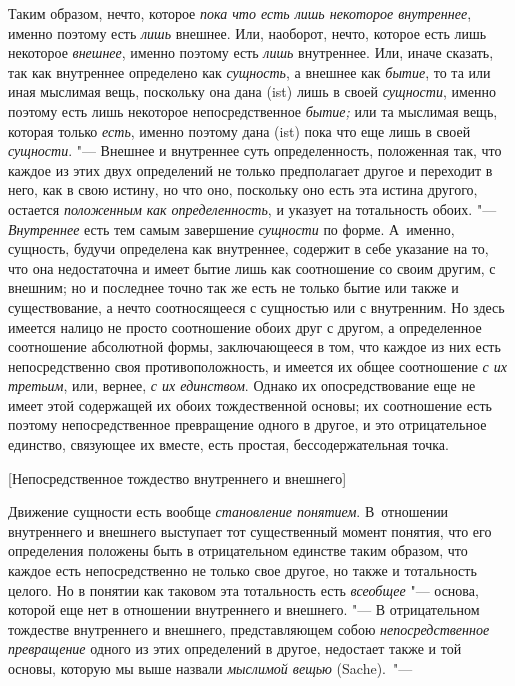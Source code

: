 Таким образом, нечто, которое {\em пока что есть лишь
некоторое внутреннее}, именно поэтому есть {\em лишь}
внешнее. Или, наоборот, нечто, которое есть лишь некоторое
{\em внешнее}, именно поэтому есть
{\em лишь} внутреннее. Или, иначе сказать, так как
внутреннее определено как {\em сущность}, а внешнее как
{\em бытие}, то та или иная мыслимая вещь, поскольку
она дана (ist) лишь в своей {\em сущности}, именно
поэтому есть лишь некоторое непосредственное
{\em бытие;} или та мыслимая вещь, которая только
{\em есть}, именно поэтому дана (ist) пока что еще лишь
в своей {\em сущности}. "--- Внешнее и внутреннее суть
определенность, положенная так, что каждое из этих двух определений не
только предполагает другое и переходит в него, как в свою истину, но что
оно, поскольку оно есть эта истина другого, остается
{\em положенным как определенность}, и указует на
тотальность обоих. "--- {\em Внутреннее} есть тем самым
завершение {\em сущности} по форме. А~именно, сущность,
будучи определена как внутреннее, содержит в себе указание на то, что она
недостаточна и имеет бытие лишь как соотношение со своим другим, с внешним;
но и последнее точно так же есть не только бытие или также и существование,
а нечто соотносящееся с сущностью или с внутренним. Но здесь имеется налицо
не просто соотношение обоих друг с другом, а определенное соотношение
абсолютной формы, заключающееся в том, что каждое из них есть
непосредственно своя противоположность, и имеется их общее соотношение
{\em с их третьим}, или, вернее,
{\em с их единством}. Однако их опосредствование еще не
имеет этой содержащей их обоих тождественной основы; их соотношение есть
поэтому непосредственное превращение одного в другое, и это отрицательное
единство, связующее их вместе, есть простая, бессодержательная точка.

%
  {[Непосредственное тождество внутреннего и внешнего]}

Движение сущности есть вообще {\em становление
понятием}. В~отношении внутреннего и внешнего выступает тот существенный
момент понятия, что его определения положены быть в отрицательном единстве
таким образом, что каждое есть непосредственно не только свое другое, но
также и тотальность целого. Но в понятии как таковом эта тотальность есть
{\em всеобщее} "--- основа, которой еще нет в отношении
внутреннего и внешнего. "--- В отрицательном тождестве внутреннего и внешнего,
представляющем собою {\em непосредственное превращение}
одного из этих определений в другое, недостает также и той основы, которую
мы выше назвали {\em мыслимой вещью} (Sache).~"---

